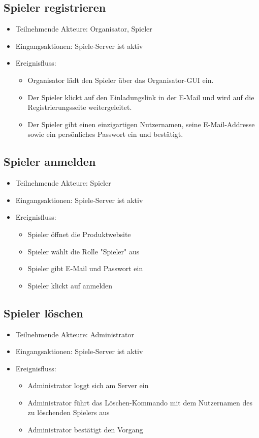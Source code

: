 \documentclass[a4paper]{scrreprt}
\begin{document}
    \subsection{Spieler registrieren}
    \begin{itemize}
        \item Teilnehmende Akteure: Organisator, Spieler
        \item Eingangsaktionen: Spiele-Server ist aktiv
        \item Ereignisfluss:
        \begin{itemize}
            \item Organisator lädt den Spieler über das Organisator-GUI ein.
            \item Der Spieler klickt auf den Einladungslink in der E-Mail und wird auf die Registrierungsseite weitergeleitet.
            \item Der Spieler gibt einen einzigartigen Nutzernamen, seine E-Mail-Addresse sowie ein persönliches Passwort ein und bestätigt.
        \end{itemize}
    \end{itemize}

    \subsection{Spieler anmelden}
    \begin{itemize}
        \item Teilnehmende Akteure: Spieler
        \item Eingangsaktionen: Spiele-Server ist aktiv
        \item Ereignisfluss:
        \begin{itemize}
            \item Spieler öffnet die Produktwebsite
            \item Spieler wählt die Rolle "Spieler" aus
            \item Spieler gibt E-Mail und Passwort ein
            \item Spieler klickt auf anmelden
        \end{itemize}
    \end{itemize}

    \subsection{Spieler löschen}
    \begin{itemize}
        \item Teilnehmende Akteure: Administrator
        \item Eingangsaktionen: Spiele-Server ist aktiv
        \item Ereignisfluss:
        \begin{itemize}
            \item Administrator loggt sich am Server ein
            \item Administrator führt das Löschen-Kommando mit dem Nutzernamen des zu löschenden Spielers aus
            \item Administrator bestätigt den Vorgang
        \end{itemize}
    \end{itemize}
\end{document}
